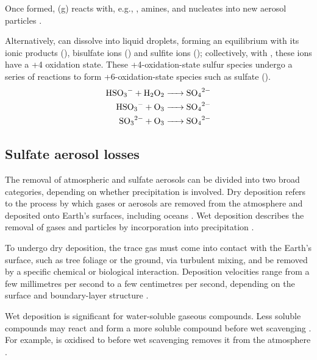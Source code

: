 Once formed,  (g) reacts with, e.g., , amines,  and nucleates into new aerosol particles \citep{seinfeldAtmosphericChemistryPhysics2016}.

Alternatively,  can dissolve into liquid droplets, forming an equilibrium with its ionic products (), bisulfate ions () and sulfite ions (); collectively, with , these ions have a +4 oxidation state. These +4-oxidation-state sulfur species undergo a series of reactions to form +6-oxidation-state species such as sulfate (). 
\begin{align}
    \ce{HSO3- + H2O2 &-> SO4^2-} \\
    \ce{HSO3- + O3 &-> SO4^2-} \\
    \ce{SO3^2- + O3 &-> SO4^2-} 
\label{ch1:eq:so2_o3}
\end{align}

\subsection{Sulfate aerosol losses}

The removal of atmospheric  and sulfate aerosols can be divided into two broad categories, depending on whether precipitation is involved. Dry deposition refers to the process by which gases or aerosols are removed from the atmosphere and deposited onto Earth's surfaces, including oceans \citep{dewysAssessmentFateSulfur1978}. Wet deposition describes the removal of gases and particles by incorporation into precipitation \citep{wayneChemistryAtmospheresIntroduction2006}. 

To undergo dry deposition, the trace gas must come into contact with the Earth's surface, such as tree foliage or the ground, via turbulent mixing, and be removed by a specific chemical or biological interaction. Deposition velocities range from a few millimetres per second to a few centimetres per second, depending on the surface and boundary-layer structure \citep[e.g.,][]{smithAirborneTransportSulphur1975, hardacreEvaluationSO2SO422021, mulcahyUKESM11DevelopmentEvaluation2023}.

Wet deposition is significant for water-soluble gaseous compounds. Less soluble compounds may react and form a more soluble compound before wet scavenging \citep{wayneChemistryAtmospheresIntroduction2006}. For example,  is oxidised to  before wet scavenging removes it from the atmosphere \citep{seinfeldAtmosphericChemistryPhysics2016}.


